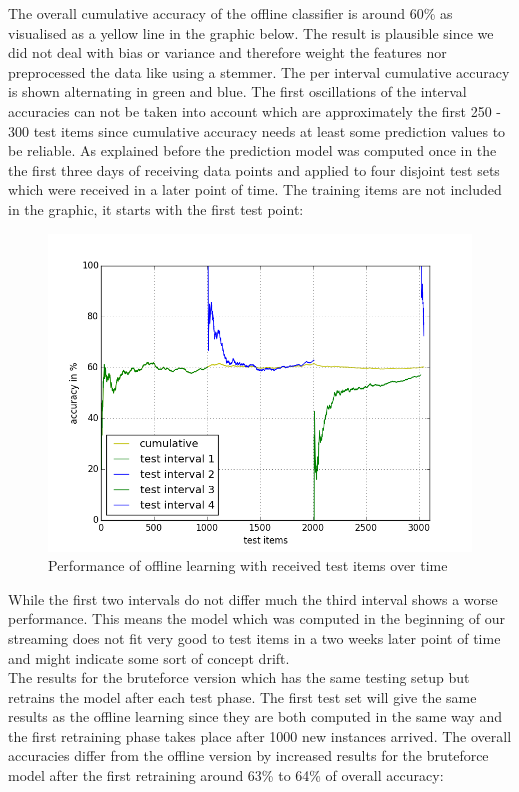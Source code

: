 \documentclass{article} %
\begin{document}
The overall cumulative accuracy of the offline classifier is around 60\% as visualised as a yellow line in the graphic below. The result is plausible since we did not deal with bias or variance and therefore weight the features nor preprocessed the data like using a stemmer. The per interval cumulative accuracy is shown alternating in green and blue. The first oscillations of the interval accuracies can not be taken into account which are approximately the first 250 - 300 test items since cumulative accuracy needs at least some prediction values to be reliable. As explained before the prediction model was computed once in the the first three days of receiving data points and applied to four disjoint test sets which were received in a later point of time. The training items are not included in the graphic, it starts with the first test point:
\begin{figure}[htbp]
  \centering
  \includegraphics[scale=0.5]{./plots/batchPlot.png}
  \caption{Performance of offline learning with received test items over time}
\end{figure}
\newpage
While the first two intervals do not differ much the third interval shows a worse performance. This means the model which was computed in the beginning of our streaming does not fit very good to test items in a two weeks later point of time and  might indicate some sort of concept drift.\\

The results for the bruteforce version which has the same testing setup but retrains the model after each test phase. The first test set will give the same results as the offline learning since they are both computed in the same way and the first retraining phase takes place after 1000 new instances arrived. The overall accuracies differ from the offline version by increased results for the bruteforce model after the first retraining around 63\% to 64\% of overall accuracy: 
\end{document}
